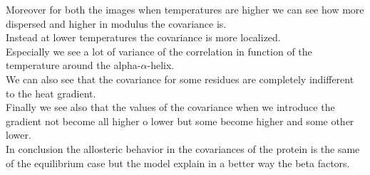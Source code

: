 \documentclass[English, Lau, oneside]{sapthesis}
\begin{document}
Moreover for both the images when temperatures are higher we can see how more dispersed and higher in modulus the covariance is.\\
Instead at lower temperatures the covariance is more localized.\\
Especially we see a lot of variance of the correlation in function  of the temperature around the alpha-$\alpha$-helix.\\
We can also see that the covariance for some residues are completely indifferent to the heat gradient.\\
Finally we see also that the values of the covariance when we introduce the gradient not become all higher o lower but some become higher and some other lower.\\
In conclusion the allosteric behavior in the covariances of the protein is the same of the equilibrium case but the model explain in a better way the beta factors.\\
\end{document}
